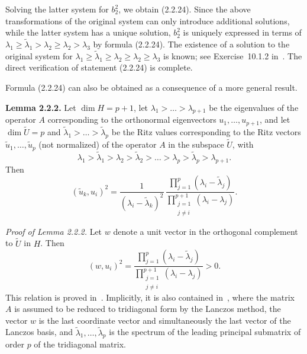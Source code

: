 \documentclass[11pt,oneside]{book}
\begin{document}
Solving the latter system for $b_2^2$, we obtain (2.2.24). Since the above transformations of the original system can only introduce additional solutions, while the latter system has a unique solution, $b_2^2$ is uniquely expressed in terms of $\lambda_1 \geqslant \tilde{\lambda}_1 > \lambda_2 \geqslant \lambda_2 > \lambda_3$ %
by formula (2.2.24). The existence of a solution to the original system
for $\lambda_1 \geqslant \tilde{\lambda}_1 \geqslant \lambda_2 \geqslant \lambda_2 \geqslant \lambda_3$ is known; %
see Exercise~10.1.2 in~\citep{Parlett1983}. The direct verification of statement (2.2.24) is complete.

Formula (2.2.24) can also be obtained as a consequence of a more general result.

\textbf{Lemma 2.2.2.} Let $\dim H = p + 1$, let $\lambda_1 > \ldots > \lambda_{p+1}$ be the eigenvalues of the operator $A$ corresponding to the orthonormal eigenvectors $u_1, \ldots, u_{p+1}$, and let $\dim \widetilde{U} = p$ and $\tilde{\lambda}_1 > \ldots > \tilde{\lambda}_p$ be the Ritz values corresponding to the Ritz vectors $\tilde{u}_1, \ldots, \tilde{u}_p$ (not normalized) of the operator $A$ in the subspace $\widetilde{U}$, with
\[
\lambda_1 > \tilde{\lambda}_1 > \lambda_2 > \tilde{\lambda}_2 > \ldots > \lambda_p > \tilde{\lambda}_p > \lambda_{p+1}. \tag{2.2.25}
\]
Then
\[
(\tilde{u}_k, u_i)^2 = \frac{1}{(\lambda_i - \tilde{\lambda}_k)^2} \, \frac{\prod_{j=1}^p (\lambda_i - \tilde{\lambda}_j)}{\prod_{\substack{j=1 \\ j \neq i}}^{p+1} (\lambda_i - \lambda_j)}. \tag{2.2.26}
\]

\textit{Proof of Lemma 2.2.2.} Let $w$ denote a unit vector in the orthogonal complement to $\widetilde{U}$ in $H$. Then
\[
(w, u_i)^2 = \frac{\prod_{j=1}^p (\lambda_i - \tilde{\lambda}_j)}{\prod_{\substack{j=1 \\ j \neq i}}^{p+1} (\lambda_i - \lambda_j)} > 0. \tag{2.2.27}
\]
This relation is proved in~\citep[pp.~432--433]{GolubVanLoan1983}. Implicitly, it is also contained in~\citep[formula~(7.9.4c)]{Parlett1983}, where the matrix $A$ is assumed to be reduced to tridiagonal form by the Lanczos method, the vector $w$ is the last coordinate vector and simultaneously the last vector of the Lanczos basis, and $\tilde{\lambda}_1, \ldots, \tilde{\lambda}_p$ is the spectrum of the leading principal submatrix of order $p$ of the tridiagonal matrix.
\end{document}
